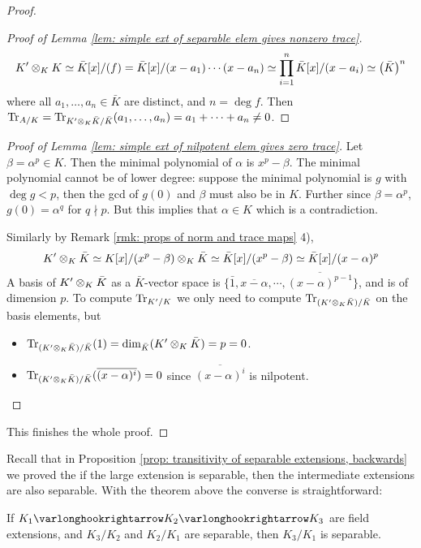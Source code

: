 \begin{proof}
\begin{proof}[Proof of Lemma \ref{lem: simple ext of separable elem gives nonzero trace}]
        \[
            K' \otimes_K K\simeq \bar{K}[x]/(f) = \bar{K}[x]/(x - a_1) \cdots (x - a_n) \simeq \prod_{i = 1}^{n}\bar{K}[x]/(x - a_i) \simeq \left( \bar{K} \right)^n
        \]
        where all $a_1, \dots, a_n \in \bar{K}$ are distinct, and $n = \deg f$. Then $\operatorname{Tr}_{A/K} = \operatorname{Tr}_{K' \otimes_K \bar{K}/\bar{K}}(a_1, \dots, a_n) = a_1 + \cdots + a_n \neq 0$.
    \end{proof}
    \begin{proof}[Proof of Lemma \ref{lem: simple ext of nilpotent elem gives zero trace}]
        Let $\beta = \alpha^p \in K$. Then the minimal polynomial of $\alpha$ is $x^p - \beta$. The minimal polynomial cannot be of lower degree: suppose the minimal polynomial is $g$ with $\deg g < p$, then the gcd of $g(0)$ and $\beta$ must also be in $K$. Further since $\beta = \alpha^p$, $g(0) = \alpha^q$ for $q \nmid p$. But this implies that $\alpha \in K$ which is a contradiction.

        Similarly by Remark \ref{rmk: props of norm and trace maps} 4),
        \[
            K' \otimes_K \bar{K} \simeq K[x]/(x^p - \beta) \otimes_K \bar{K} \simeq \bar{K}[x]/(x^p - \beta) \simeq \bar{K}[x]/(x - \alpha)^p
        \]
        A basis of $K' \otimes_K \bar{K}$ as a $\bar{K}$-vector space is $\{\bar{1}, \overline{x - \alpha}, \cdots, \overline{(x - \alpha)^{p-1}}\}$, and is of dimension $p$. To compute $\operatorname{Tr}_{K'/K}$ we only need to compute $\operatorname{Tr}_{(K' \otimes_K \bar{K})/\bar{K}}$ on the basis elements, but
        \begin{itemize}
            \item $\operatorname{Tr}_{(K' \otimes_K \bar{K})/\bar{K}}(1) = \dim_{\bar{K}} (K' \otimes_K \bar{K}) = p = 0$.
            \item $\operatorname{Tr}_{(K' \otimes_K \bar{K})/\bar{K}}(\overline{(x - \alpha)^i}) = 0$ since $\overline{(x - \alpha)^i}$ is nilpotent. 
        \end{itemize}
    \end{proof}
    This finishes the whole proof.
\end{proof}

Recall that in Proposition \ref{prop: transitivity of separable extensions, backwards} we proved the if the large extension is separable, then the intermediate extensions are also separable. With the theorem above the converse is straightforward:

\begin{corollary}\label{prop: transitivity of separable extensions, forwards}
    If $K_1 \ext K_2 \ext K_3$ are field extensions, and $K_3/K_2$ and $K_2/K_1$ are separable, then $K_3/K_1$ is separable. 
\end{corollary}

